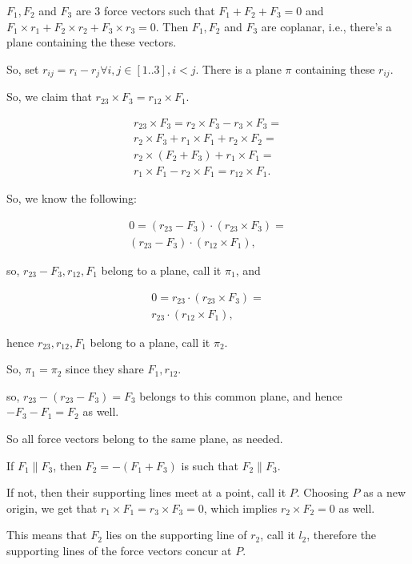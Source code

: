 \documentclass[12pt]{minimal}
\begin{document}
	$F_1, F_2$ and $F_3$ are 3 force vectors such that $F_1 + F_2 + F_3 = 0$ and
	$F_1 \times r_1 + F_2 \times r_2 + F_3 \times r_3 = 0$.
	Then $F_1, F_2$ and $F_3$ are coplanar, i.e., there's a plane containing the
	these vectors.

	So, set $r_{ij} = r_i - r_j \forall i, j \in [1\mathrm{..}3], i < j $. There
	is a plane $\pi$ containing these $r_{ij}$. 

	So, we claim that $r_{23} \times F_3 = r_{12} \times F_1$.

	\begin{align*}
		r_{23} \times F_3 = r_2 \times F_3 - r_3 \times F_3 = \\
		r_2 \times F_3 + r_1 \times F_1 + r_2 \times F_2 = \\
		r_2 \times (F_2 + F_3) + r_1 \times F_1 = \\
		r_1 \times F_1 - r_2 \times F_1 = r_{12}\times F_1.
	\end{align*}

	So, we know the following:

	\begin{align*}
		0 = (r_{23} - F_3) \cdot (r_{23} \times F_3) = \\
		(r_{23} - F_3) \cdot (r_{12} \times F_1),
	\end{align*}

	so, $r_{23} - F_3, r_{12}, F_1$ belong to a plane, call it $\pi_1$, and

	\begin{align*}
		0 = r_{23} \cdot (r_{23} \times F_3) = \\
		r_{23} \cdot (r_{12} \times F_1),
	\end{align*}

	hence $r_{23}, r_{12}, F_1$ belong to a plane, call it $\pi_2$.

	So, $\pi_1 = \pi_2$ since they share $F_1, r_{12}$.

	so, $r_{23} - (r_{23} - F_3) = F_3$ belongs to this common plane, and
	hence  $-F_3 - F_1 = F_2$ as well.

	So all force vectors belong to the same plane, as needed.

	If $F_1 \parallel F_3$, then $ F_2 = -(F_1 + F_3)$ is such that $F_2 \parallel F_3$.

	If not, then their supporting lines meet at a point, call it $P$. Choosing $P$ as
	a new origin, we get that $r_1 \times F_1 = r_3 \times F_3 = 0$, which implies
	$r_2 \times F_2 = 0$ as well.

	This means that $F_2$ lies on the supporting line of $r_2$, call it $l_2$, therefore
	the supporting lines of the force vectors concur at $P$.
\end{document}
